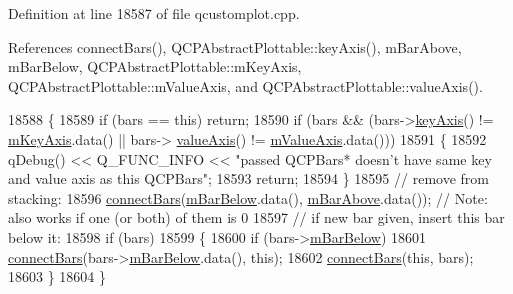 Definition at line 18587 of file qcustomplot.\+cpp.



References connect\+Bars(), Q\+C\+P\+Abstract\+Plottable\+::key\+Axis(), m\+Bar\+Above, m\+Bar\+Below, Q\+C\+P\+Abstract\+Plottable\+::m\+Key\+Axis, Q\+C\+P\+Abstract\+Plottable\+::m\+Value\+Axis, and Q\+C\+P\+Abstract\+Plottable\+::value\+Axis().


\begin{DoxyCode}
18588 \{
18589   \textcolor{keywordflow}{if} (bars == \textcolor{keyword}{this}) \textcolor{keywordflow}{return};
18590   \textcolor{keywordflow}{if} (bars && (bars->\hyperlink{class_q_c_p_abstract_plottable_a72c7a09c22963f2c943f07112b311103}{keyAxis}() != \hyperlink{class_q_c_p_abstract_plottable_a426f42e254d0f8ce5436a868c61a6827}{mKeyAxis}.data() || bars->
      \hyperlink{class_q_c_p_abstract_plottable_a3106f9d34d330a6097a8ec5905e5b519}{valueAxis}() != \hyperlink{class_q_c_p_abstract_plottable_a2901452ca4aea911a1827717934a4bda}{mValueAxis}.data()))
18591   \{
18592     qDebug() << Q\_FUNC\_INFO << \textcolor{stringliteral}{"passed QCPBars* doesn't have same key and value axis as this QCPBars"};
18593     \textcolor{keywordflow}{return};
18594   \}
18595   \textcolor{comment}{// remove from stacking:}
18596   \hyperlink{class_q_c_p_bars_a6ea37802cd22f97235cab614b14b9f19}{connectBars}(\hyperlink{class_q_c_p_bars_ad51db970eed7e286f2753b0216fc56de}{mBarBelow}.data(), \hyperlink{class_q_c_p_bars_a0c1c46076c41a478dbb373cfd35929aa}{mBarAbove}.data()); \textcolor{comment}{// Note: also works if one
       (or both) of them is 0}
18597   \textcolor{comment}{// if new bar given, insert this bar below it:}
18598   \textcolor{keywordflow}{if} (bars)
18599   \{
18600     \textcolor{keywordflow}{if} (bars->\hyperlink{class_q_c_p_bars_ad51db970eed7e286f2753b0216fc56de}{mBarBelow})
18601       \hyperlink{class_q_c_p_bars_a6ea37802cd22f97235cab614b14b9f19}{connectBars}(bars->\hyperlink{class_q_c_p_bars_ad51db970eed7e286f2753b0216fc56de}{mBarBelow}.data(), \textcolor{keyword}{this});
18602     \hyperlink{class_q_c_p_bars_a6ea37802cd22f97235cab614b14b9f19}{connectBars}(\textcolor{keyword}{this}, bars);
18603   \}
18604 \}
\end{DoxyCode}



